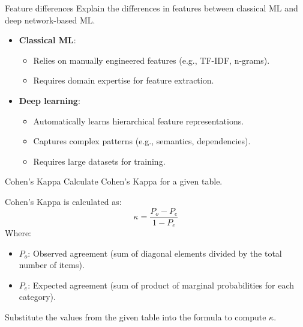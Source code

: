 \documentclass{article}
\begin{document}
\begin{exercise}{Feature differences}
  Explain the differences in features between classical ML and deep network-based ML.

  \begin{solution}
    \begin{itemize}
        \item \textbf{Classical ML}:
        \begin{itemize}
            \item Relies on manually engineered features (e.g., TF-IDF, n-grams).
            \item Requires domain expertise for feature extraction.
        \end{itemize}
        \item \textbf{Deep learning}:
        \begin{itemize}
            \item Automatically learns hierarchical feature representations.
            \item Captures complex patterns (e.g., semantics, dependencies).
            \item Requires large datasets for training.
        \end{itemize}
    \end{itemize}
  \end{solution}
\end{exercise}

\begin{exercise}{Cohen's Kappa}
  Calculate Cohen's Kappa for a given table.

  \begin{solution}
    Cohen's Kappa is calculated as:
    \[
    \kappa = \frac{P_o - P_e}{1 - P_e}
    \]
    Where:
    \begin{itemize}
        \item \(P_o\): Observed agreement (sum of diagonal elements divided by the total number of items).
        \item \(P_e\): Expected agreement (sum of product of marginal probabilities for each category).
    \end{itemize}
    Substitute the values from the given table into the formula to compute \(\kappa\).
  \end{solution}
\end{exercise}
\end{document}
